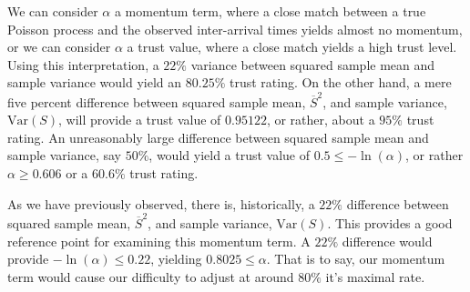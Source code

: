 \documentclass[12pt,english]{mrl}
\theoremstyle{definition}
\renewcommand{\geq}{\geqslant}
\renewcommand{\leq}{\leqslant}
\numberwithin{equation}{section}
\numberwithin{figure}{section}
\numberwithin{equation}{section}
\numberwithin{equation}{section}
\numberwithin{figure}{section}
\begin{document}
We can consider $\alpha$ a momentum term, where a close match between a true Poisson process and the observed inter-arrival times yields almost no momentum, or we can consider $\alpha$ a trust value, where a close match yields a high trust level. Using this interpretation, a $22\%$ variance between squared sample mean and sample variance would yield an $80.25\%$ trust rating.  On the other hand, a mere five percent difference between squared sample mean, $\overline{S}^2$, and sample variance, $\text{Var}(S)$, will provide a trust value of $0.95122$, or rather, about a $95\%$ trust rating. An unreasonably large difference between squared sample mean and sample variance, say $50\%$, would yield a trust value of $0.5 \leq -\ln(\alpha)$, or rather $\alpha \geq 0.606$ or a $60.6\%$ trust rating. 

As we have previously observed, there is, historically, a $22\%$ difference between squared sample mean, $\overline{S}^2$, and sample variance, $\text{Var}(S)$. This provides a good reference point for examining this momentum term. A $22\%$ difference would provide $-\ln(\alpha) \leq 0.22$, yielding $0.8025 \leq \alpha$. That is to say, our momentum term would cause our difficulty to adjust at around $80\%$ it's maximal rate.

\end{document}
